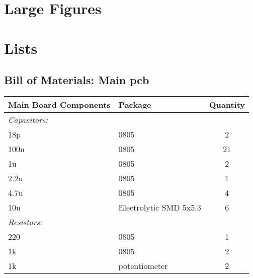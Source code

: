 \section{Large Figures}\label{sec:app}

\clearpage
\section{Lists}
\subsection{Bill of Materials: Main \gls{pcb}}
\begin{center}
\begin{tabular}{|l|l|c|}
	\hline
	\bf{Main Board Components} & \bf{Package} & \bf{Quantity} \\
	\hline
	\emph{Capacitors:} & & \\
	\hline
	18p & 0805 & 2 \\
	\hline
	100n & 0805 & 21 \\
	\hline
	1u & 0805 & 2 \\
	\hline 
	2.2u & 0805 & 1 \\
	\hline 
	4.7u & 0805 & 4 \\
	\hline 
	10u & Electrolytic SMD 5x5.3 & 6 \\
	\hline
	\emph{Resistors:} & & \\
	\hline
	220 & 0805 & 1 \\
	\hline
	1k & 0805 & 2 \\
	\hline
	1k & potentiometer & 2 \\
	\hline

\end{tabular}
\end{center}

